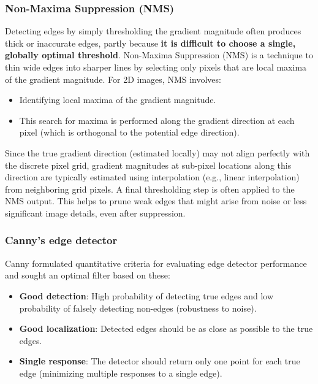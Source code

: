 \subsubsection{Non-Maxima Suppression (NMS)}

Detecting edges by simply thresholding the gradient magnitude often produces thick or inaccurate edges, partly because \textbf{it is difficult to choose a single, globally optimal threshold}.
Non-Maxima Suppression (NMS) is a technique to thin wide edges into sharper lines by selecting only pixels that are local maxima of the gradient magnitude.
For 2D images, NMS involves:
\begin{itemize}
  \item Identifying local maxima of the gradient magnitude.
  \item This search for maxima is performed along the gradient direction at each pixel (which is orthogonal to the potential edge direction).
\end{itemize}
Since the true gradient direction (estimated locally) may not align perfectly with the discrete pixel grid, gradient magnitudes at sub-pixel locations along this direction are typically estimated using interpolation (e.g., linear interpolation) from neighboring grid pixels.
A final thresholding step is often applied to the NMS output. This helps to prune weak edges that might arise from noise or less significant image details, even after suppression.

\subsubsection{Canny's edge detector}
Canny formulated quantitative criteria for evaluating edge detector performance and sought an optimal filter based on these:
\begin{itemize}
  \item \textbf{Good detection}: High probability of detecting true edges and low probability of falsely detecting non-edges (robustness to noise).
  \item \textbf{Good localization}: Detected edges should be as close as possible to the true edges.
  \item \textbf{Single response}: The detector should return only one point for each true edge (minimizing multiple responses to a single edge).
\end{itemize}

